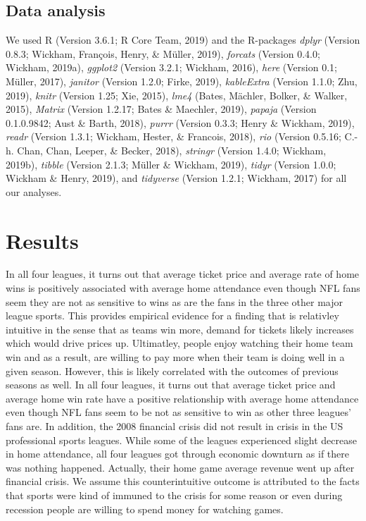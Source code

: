 \documentclass[man, fleqn, noextraspace,floatsintext]{apa6}
\begin{document}
\subsection{Data analysis}\label{data-analysis}

We used R (Version 3.6.1; R Core Team, 2019) and the R-packages
\emph{dplyr} (Version 0.8.3; Wickham, François, Henry, \& Müller, 2019),
\emph{forcats} (Version 0.4.0; Wickham, 2019a), \emph{ggplot2} (Version
3.2.1; Wickham, 2016), \emph{here} (Version 0.1; Müller, 2017),
\emph{janitor} (Version 1.2.0; Firke, 2019), \emph{kableExtra} (Version
1.1.0; Zhu, 2019), \emph{knitr} (Version 1.25; Xie, 2015), \emph{lme4}
(Bates, Mächler, Bolker, \& Walker, 2015), \emph{Matrix} (Version
1.2.17; Bates \& Maechler, 2019), \emph{papaja} (Version 0.1.0.9842;
Aust \& Barth, 2018), \emph{purrr} (Version 0.3.3; Henry \& Wickham,
2019), \emph{readr} (Version 1.3.1; Wickham, Hester, \& Francois, 2018),
\emph{rio} (Version 0.5.16; C.-h. Chan, Chan, Leeper, \& Becker, 2018),
\emph{stringr} (Version 1.4.0; Wickham, 2019b), \emph{tibble} (Version
2.1.3; Müller \& Wickham, 2019), \emph{tidyr} (Version 1.0.0; Wickham \&
Henry, 2019), and \emph{tidyverse} (Version 1.2.1; Wickham, 2017) for
all our analyses.

\section{Results}\label{results}

In all four leagues, it turns out that average ticket price and average
rate of home wins is positively associated with average home attendance
even though NFL fans seem they are not as sensitive to wins as are the
fans in the three other major league sports. This provides empirical
evidence for a finding that is relativley intuitive in the sense that as
teams win more, demand for tickets likely increases which would drive
prices up. Ultimatley, people enjoy watching their home team win and as
a result, are willing to pay more when their team is doing well in a
given season. However, this is likely correlated with the outcomes of
previous seasons as well. In all four leagues, it turns out that average
ticket price and average home win rate have a positive relationship with
average home attendance even though NFL fans seem to be not as sensitive
to win as other three leagues' fans are. In addition, the 2008 financial
crisis did not result in crisis in the US professional sports leagues.
While some of the leagues experienced slight decrease in home
attendance, all four leagues got through economic downturn as if there
was nothing happened. Actually, their home game average revenue went up
after financial crisis. We assume this counterintuitive outcome is
attributed to the facts that sports were kind of immuned to the crisis
for some reason or even during recession people are willing to spend
money for watching games.
\end{document}
